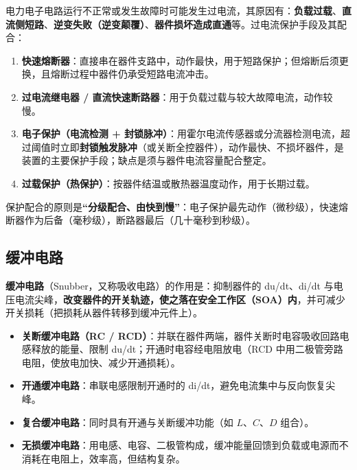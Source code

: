 电力电子电路运行不正常或发生故障时可能发生过电流，其原因有：\textbf{负载过载}、\textbf{直流侧短路}、\textbf{逆变失败（逆变颠覆）}、\textbf{器件损坏造成直通}等。过电流保护手段及其配合：

\begin{enumerate}
  \item \textbf{快速熔断器}：直接串在器件支路中，动作最快，用于短路保护；但熔断后须更换，且熔断过程中器件仍承受短路电流冲击。
  \item \textbf{过电流继电器 / 直流快速断路器}：用于负载过载与较大故障电流，动作较慢。
  \item \textbf{电子保护（电流检测 + 封锁脉冲）}：用霍尔电流传感器或分流器检测电流，超过阈值时立即\textbf{封锁触发脉冲}（或关断全控器件），动作最快、不损坏器件，是装置的主要保护手段；缺点是须与器件电流容量配合整定。
  \item \textbf{过载保护（热保护）}：按器件结温或散热器温度动作，用于长期过载。
\end{enumerate}

保护配合的原则是\textbf{“分级配合、由快到慢”}：电子保护最先动作（微秒级），快速熔断器作为后备（毫秒级），断路器最后（几十毫秒到秒级）。

\subsection{缓冲电路}

\textbf{缓冲电路}（Snubber，又称吸收电路）的作用是：抑制器件的 du/dt、di/dt 与电压电流尖峰，\textbf{改变器件的开关轨迹，使之落在安全工作区（SOA）内}，并可减少开关损耗（把损耗从器件转移到缓冲元件上）。

\begin{itemize}
  \item \textbf{关断缓冲电路（RC / RCD）}：并联在器件两端，器件关断时电容吸收回路电感释放的能量、限制 du/dt；开通时电容经电阻放电（RCD 中用二极管旁路电阻，使放电加快、减少开通损耗）。
  \item \textbf{开通缓冲电路}：串联电感限制开通时的 di/dt，避免电流集中与反向恢复尖峰。
  \item \textbf{复合缓冲电路}：同时具有开通与关断缓冲功能（如 $L$、$C$、$D$ 组合）。
  \item \textbf{无损缓冲电路}：用电感、电容、二极管构成，缓冲能量回馈到负载或电源而不消耗在电阻上，效率高，但结构复杂。
\end{itemize}


